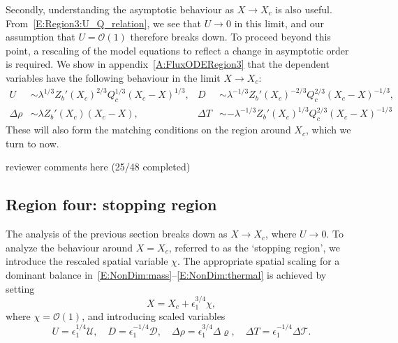 \documentclass[openacc]{rsproca_new}%
\newcommand{\order}[1]{\mathcal{O}(#1)}
\newcommand{\red}[1]{{\color{red} #1}}
\newcommand{\epsone}{\epsilon_{1}} %
\begin{document}
Secondly, understanding the asymptotic behaviour as $X \to X_c$ is also useful. From~\eqref{E:Region3:U_Q_relation}, we see that $U \to 0$ in this limit, and our assumption that $U = \order{1}$ therefore breaks down. To proceed beyond this point, a rescaling of the model equations to reflect a change in asymptotic order is required. \red{We show in appendix~\ref{A:FluxODERegion3}} that the dependent variables have the following behaviour in the limit $X \to X_c$:
\begin{align}
U &\sim \lambda^{1/3} Z_b'(X_c)^{2/3} Q_c^{1/3}(X_c - X)^{1/3}, & D &\sim \lambda^{-1/3} Z_b'(X_c)^{-2/3} Q_c^{2/3}(X_c - X)^{-1/3},\label{E:Region3:X_to_Xc1}\\
\Delta \rho &\sim  \lambda Z_b'(X_c) (X_c - X), & \Delta T &\sim -\lambda^{-1/3} Z_b'(X_c)^{1/3} Q_c^{2/3}(X_c - X)^{-1/3}\label{E:Region3:X_to_Xc2}
\end{align}
These will also form the matching conditions on the region around $X_c$, which we turn to now.


\red{reviewer comments here (25/48 completed)}
\subsection{Region four: stopping region}\label{S:Asymptotics:Region4}
The analysis of the previous section breaks down as $X \to X_c$, where $U \to 0$. To analyze the behaviour around $X = X_c$, referred to as the `stopping region', we introduce the rescaled spatial variable $\chi$. The appropriate spatial scaling for a dominant balance in~\eqref{E:NonDim:mass}--\eqref{E:NonDim:thermal} is achieved by setting 
\begin{equation}\label{E:Region4:X_scaling}
X = X_c + \epsone^{3/4}\chi,
\end{equation}
where $\chi = \order{1}$, and introducing scaled variables
\begin{equation}\label{E:Region4:var_scaling}
U = \epsone^{1/4}\mathcal{U}, \quad D = \epsone^{-1/4}\mathcal{D}, \quad \Delta \rho = \epsone^{3/4}\Delta \varrho, \quad  \Delta T = \epsone^{-1/4} \Delta \mathcal{T}.
\end{equation}
\end{document}
